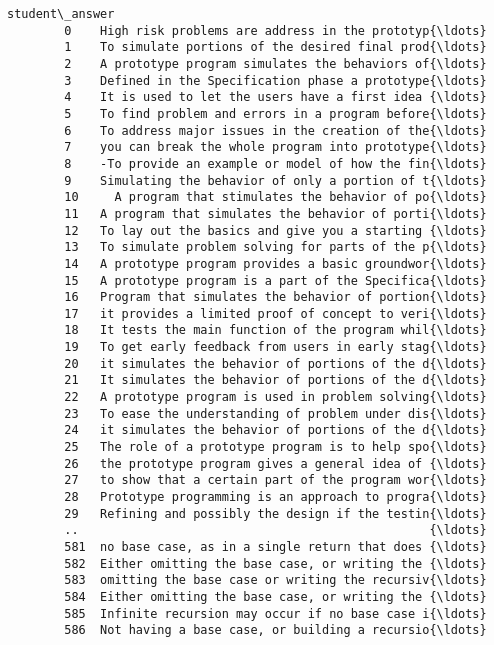 \documentclass[11pt]{article}
\begin{document}
\begin{Verbatim}[commandchars=\\\{\}]
                                                student\_answer  
        0    High risk problems are address in the prototyp{\ldots}  
        1    To simulate portions of the desired final prod{\ldots}  
        2    A prototype program simulates the behaviors of{\ldots}  
        3    Defined in the Specification phase a prototype{\ldots}  
        4    It is used to let the users have a first idea {\ldots}  
        5    To find problem and errors in a program before{\ldots}  
        6    To address major issues in the creation of the{\ldots}  
        7    you can break the whole program into prototype{\ldots}  
        8    -To provide an example or model of how the fin{\ldots}  
        9    Simulating the behavior of only a portion of t{\ldots}  
        10     A program that stimulates the behavior of po{\ldots}  
        11   A program that simulates the behavior of porti{\ldots}  
        12   To lay out the basics and give you a starting {\ldots}  
        13   To simulate problem solving for parts of the p{\ldots}  
        14   A prototype program provides a basic groundwor{\ldots}  
        15   A prototype program is a part of the Specifica{\ldots}  
        16   Program that simulates the behavior of portion{\ldots}  
        17   it provides a limited proof of concept to veri{\ldots}  
        18   It tests the main function of the program whil{\ldots}  
        19   To get early feedback from users in early stag{\ldots}  
        20   it simulates the behavior of portions of the d{\ldots}  
        21   It simulates the behavior of portions of the d{\ldots}  
        22   A prototype program is used in problem solving{\ldots}  
        23   To ease the understanding of problem under dis{\ldots}  
        24   it simulates the behavior of portions of the d{\ldots}  
        25   The role of a prototype program is to help spo{\ldots}  
        26   the prototype program gives a general idea of {\ldots}  
        27   to show that a certain part of the program wor{\ldots}  
        28   Prototype programming is an approach to progra{\ldots}  
        29   Refining and possibly the design if the testin{\ldots}  
        ..                                                 {\ldots}  
        581  no base case, as in a single return that does {\ldots}  
        582  Either omitting the base case, or writing the {\ldots}  
        583  omitting the base case or writing the recursiv{\ldots}  
        584  Either omitting the base case, or writing the {\ldots}  
        585  Infinite recursion may occur if no base case i{\ldots}  
        586  Not having a base case, or building a recursio{\ldots}  

\end{Verbatim}
\end{document}
